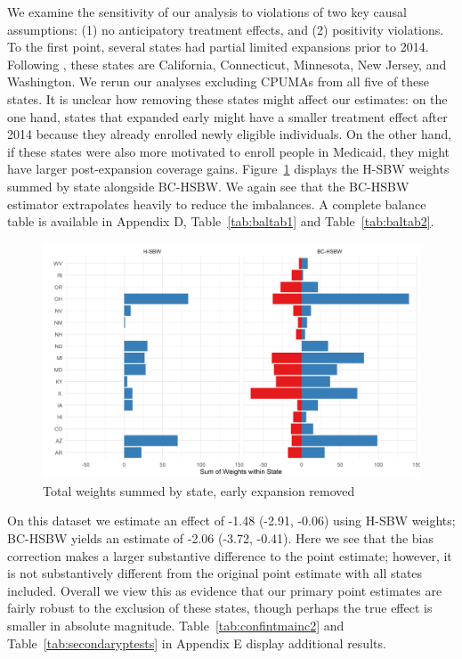\documentclass[12pt]{article}
\begin{document}
We examine the sensitivity of our analysis to violations of two key causal assumptions: (1) no anticipatory treatment effects, and (2) positivity violations. To the first point, several states had partial limited expansions prior to 2014. Following \cite{frean2017premium}, these states are California, Connecticut, Minnesota, New Jersey, and Washington. We rerun our analyses excluding CPUMAs from all five of these states. It is unclear how removing these states might affect our estimates: on the one hand, states that expanded early might have a smaller treatment effect after 2014 because they already enrolled newly eligible individuals. On the other hand, if these states were also more motivated to enroll people in Medicaid, they might have larger post-expansion coverage gains. Figure~\ref{fig:weightsbystatec2} displays the H-SBW weights summed by state alongside BC-HSBW. We again see that the BC-HSBW estimator extrapolates heavily to reduce the imbalances. A complete balance table is available in Appendix D, Table~\ref{tab:baltab1} and Table~\ref{tab:baltab2}.

\begin{figure}[]
\begin{center}
    \includegraphics[scale=0.6]{01_Plots/weights-by-state-hsbw-c2.png}
    \caption{Total weights summed by state, early expansion removed}
    \label{fig:weightsbystatec2}
\end{center}
\end{figure}

On this dataset we estimate an effect of -1.48 (-2.91, -0.06) using H-SBW weights; BC-HSBW yields an estimate of -2.06 (-3.72, -0.41). Here we see that the bias correction makes a larger substantive difference to the point estimate; however, it is not substantively different from the original point estimate with all states included. Overall we view this as evidence that our primary point estimates are fairly robust to the exclusion of these states, though perhaps the true effect is smaller in absolute magnitude. Table~\ref{tab:confintmainc2} and Table~\ref{tab:secondaryptests} in Appendix E display additional results. 
\end{document}
